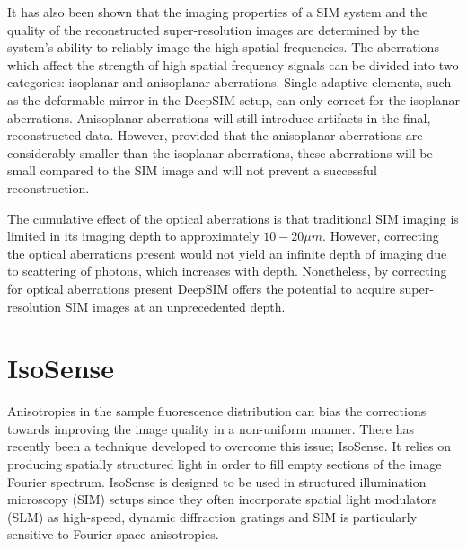 It has also been shown that the imaging properties of a SIM
system and the quality of the reconstructed super-resolution
images are determined by the system's ability to reliably
image the high spatial frequencies\cite{debarre2008adaptive,thomas2015enhanced}.
The aberrations which affect the strength of high spatial 
frequency signals can be divided into two categories: 
isoplanar and anisoplanar aberrations. Single adaptive 
elements, such as the deformable mirror in the DeepSIM 
setup, can only correct for the isoplanar aberrations.
Anisoplanar aberrations will still introduce artifacts 
in the final, reconstructed data. However, provided that
the anisoplanar aberrations are considerably smaller than
the isoplanar aberrations, these aberrations will be small
compared to the SIM image and will not prevent a successful
reconstruction\cite{thomas2015enhanced}.

The cumulative effect of the optical aberrations is that
traditional SIM imaging is limited in its imaging depth to
approximately $10-20\mu m$\cite{schermelleh2019super,wu2018faster}. However, 
correcting the optical aberrations present would not yield
an infinite depth of imaging due to scattering of photons,
which increases with depth. Nonetheless, by correcting for
optical aberrations present DeepSIM offers the potential to 
acquire super-resolution SIM images at an unprecedented depth.

\section{IsoSense}
\label{sec:isosense}

Anisotropies in the sample fluorescence distribution can bias 
the corrections towards improving the image quality in a 
non-uniform manner. There has recently been a technique developed 
to overcome  this issue; IsoSense\cite{vzurauskas2019isosense}. 
It relies  on producing spatially structured light in order to fill 
empty sections of the image Fourier spectrum. IsoSense is designed 
to be used in structured illumination microscopy (SIM) setups since 
they often incorporate spatial light modulators (SLM) as high-speed, 
dynamic diffraction  gratings and SIM is particularly sensitive to 
Fourier space anisotropies.

